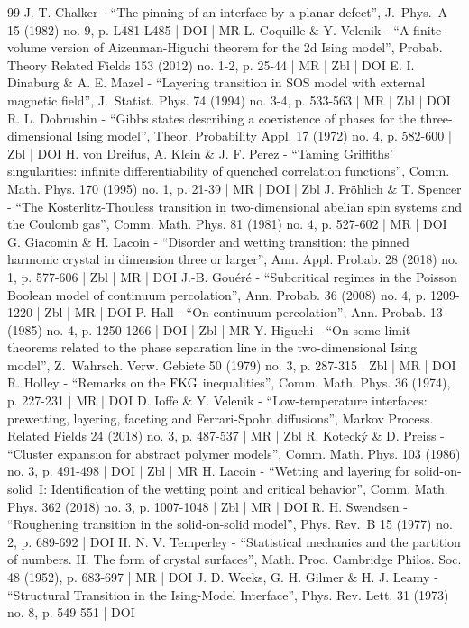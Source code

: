 \documentclass[10pt]{amsart}
\numberwithin{equation}{section}
\theoremstyle{plain}
\theoremstyle{definition}
\begin{document}
\begin{thebibliography}{99}
J. T. Chalker - “The pinning of an interface by a planar defect”, J. Phys. A 15 (1982) no. 9, p. L481-L485 | DOI | MR
L. Coquille \& Y. Velenik - “A finite-volume version of Aizenman-Higuchi theorem for the 2d Ising model”, Probab. Theory Related Fields 153 (2012) no. 1-2, p. 25-44 | MR | Zbl | DOI
E. I. Dinaburg \& A. E. Mazel - “Layering transition in SOS model with external magnetic field”, J. Statist. Phys. 74 (1994) no. 3-4, p. 533-563 | MR | Zbl | DOI
R. L. Dobrushin - “Gibbs states describing a coexistence of phases for the three-dimensional Ising model”, Theor. Probability Appl. 17 (1972) no. 4, p. 582-600 | Zbl | DOI
H. von Dreifus, A. Klein \& J. F. Perez - “Taming Griffiths’ singularities: infinite differentiability of quenched correlation functions”, Comm. Math. Phys. 170 (1995) no. 1, p. 21-39 | MR | DOI | Zbl
J. Fröhlich \& T. Spencer - “The Kosterlitz-Thouless transition in two-dimensional abelian spin systems and the Coulomb gas”, Comm. Math. Phys. 81 (1981) no. 4, p. 527-602 | MR | DOI
G. Giacomin \& H. Lacoin - “Disorder and wetting transition: the pinned harmonic crystal in dimension three or larger”, Ann. Appl. Probab. 28 (2018) no. 1, p. 577-606 | Zbl | MR | DOI
J.-B. Gouéré - “Subcritical regimes in the Poisson Boolean model of continuum percolation”, Ann. Probab. 36 (2008) no. 4, p. 1209-1220 | Zbl | MR | DOI
P. Hall - “On continuum percolation”, Ann. Probab. 13 (1985) no. 4, p. 1250-1266 | DOI | Zbl | MR
Y. Higuchi - “On some limit theorems related to the phase separation line in the two-dimensional Ising model”, Z. Wahrsch. Verw. Gebiete 50 (1979) no. 3, p. 287-315 | Zbl | MR | DOI
R. Holley - “Remarks on the ${\rm FKG}$ inequalities”, Comm. Math. Phys. 36 (1974), p. 227-231 | MR | DOI
D. Ioffe \& Y. Velenik - “Low-temperature interfaces: prewetting, layering, faceting and Ferrari-Spohn diffusions”, Markov Process. Related Fields 24 (2018) no. 3, p. 487-537 | MR | Zbl
R. Kotecký \& D. Preiss - “Cluster expansion for abstract polymer models”, Comm. Math. Phys. 103 (1986) no. 3, p. 491-498 | DOI | Zbl | MR
H. Lacoin - “Wetting and layering for solid-on-solid I: Identification of the wetting point and critical behavior”, Comm. Math. Phys. 362 (2018) no. 3, p. 1007-1048 | Zbl | MR | DOI
R. H. Swendsen - “Roughening transition in the solid-on-solid model”, Phys. Rev. B 15 (1977) no. 2, p. 689-692 | DOI
H. N. V. Temperley - “Statistical mechanics and the partition of numbers. II. The form of crystal surfaces”, Math. Proc. Cambridge Philos. Soc. 48 (1952), p. 683-697 | MR | DOI
J. D. Weeks, G. H. Gilmer \& H. J. Leamy - “Structural Transition in the Ising-Model Interface”, Phys. Rev. Lett. 31 (1973) no. 8, p. 549-551 | DOI
\end{thebibliography}
\end{document}

